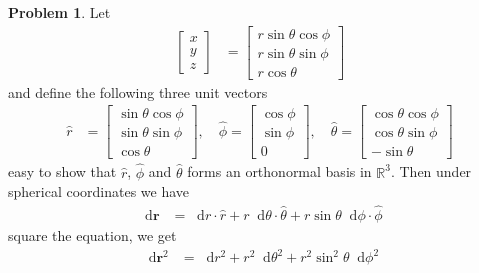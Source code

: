 \documentclass[twoside,11pt]{article}
\newcommand{\RR}{\mathbb{R}}
\renewcommand*\d{\mathop{}\!\mathrm{d}}
\theoremstyle{definition}
\newtheorem{problem}{Problem}
\theoremstyle{remark}
\begin{document}
\begin{problem}
Let 
\begin{align*}
    \begin{bmatrix}
        x\\y\\z 
    \end{bmatrix}
    &= 
    \begin{bmatrix}
        r \sin\theta\cos\phi \\
        r \sin\theta\sin\phi \\
        r \cos\theta 
    \end{bmatrix}
\end{align*}
and define the following three unit vectors
\begin{align*}
    \hat{r} &= \begin{bmatrix}
        \sin\theta\cos\phi\\
        \sin\theta\sin\phi\\
        \cos\theta
    \end{bmatrix},\quad
    \hat{\phi} = 
    \begin{bmatrix}
        \cos\phi\\
        \sin\phi\\
        0
    \end{bmatrix},\quad
    \hat{\theta} = 
    \begin{bmatrix}
        \cos\theta\cos\phi\\
        \cos\theta\sin\phi\\
        -\sin\theta
    \end{bmatrix}
\end{align*}
easy to show that $\hat{r}$, $\hat{\phi}$ and $\hat{\theta}$ forms
an orthonormal basis in $\RR^3$.
Then under spherical coordinates we have
\begin{align*}
    \d\mathbf{r} &= 
    \d r\cdot\hat{r} + r\d\theta\cdot\hat{\theta}
    + r\sin\theta\d\phi\cdot\hat{\phi}
\end{align*}
square the equation, we get
\begin{align*}
    \d\mathbf{r}^2 &= 
    \d r^2 + r^2\d\theta^2 + r^2\sin^2\theta\d\phi^2
\end{align*}

\end{problem}
\end{document}

